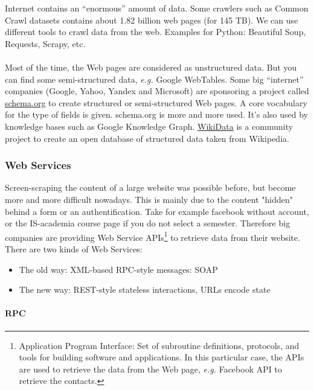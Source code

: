 Internet contains an ``enormous'' amount of data. Some crawlers such as Common Crawl datasets contains about 1.82 billion web pages (for 145 TB). We can use different tools to crawl data from the web. Examples for Python: Beautiful Soup, Requests, Scrapy, etc. 
\\\\
Most of the time, the Web pages are considered as unstructured data. But you can find some semi-structured data, {\it e.g.} Google WebTables. Some big ``internet'' companies (Google, Yahoo, Yandex and Microsoft) are sponsoring a project called \href{http://schema.org/}{schema.org} to create structured or semi-structured Web pages. A core vocabulary for the type of fields is given. schema.org is more and more used. It's also used by knowledge bases such as Google Knowledge Graph. \href{https://www.wikidata.org/wiki/Wikidata:Main\_Page}{WikiData} is a community project to create an open database of structured data taken from Wikipedia.

\subsubsection{Web Services}

Screen-scraping the content of a large website was possible before, but become more and more difficult nowadays. This is mainly due to the content "hidden" behind a form or an authentification. Take for example facebook without account, or the IS-academia course page if you do not select a semester. Therefore big companies are providing Web Service APIs\footnote{Application Program Interface: Set of subroutine definitions, protocols, and tools for building software and applications. In this particular case, the APIs are used to retrieve the data from the Web page, {\it e.g.} Facebook API to retrieve the contacts.} to retrieve data from their website. There are two kinds of Web Services:
\begin{itemize}
 \item The old way: XML-based RPC-style messages: SOAP
 \item The new way: REST-style stateless interactions, URLs encode state
\end{itemize}

\paragraph{RPC}

